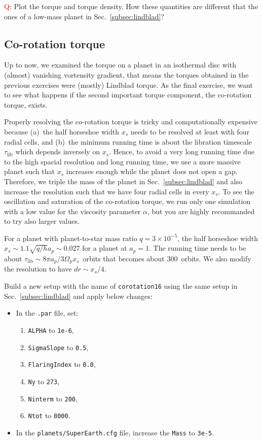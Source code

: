 \documentclass[14pt]{scrartcl}
\begin{document}
\textcolor{red}{Q}: Plot the torque and torque density. How these quantities are different that the ones of a low-mass planet in Sec.~\ref{subsec:lindblad}?

\subsection{Co-rotation torque} \label{subsec:corotation}	
Up to now, we examined the torque on a planet in an isothermal disc with (almost) vanishing vortensity gradient, that means the torques obtained in the previous exercises were (mostly) Lindblad torque. As the final exercise, we want to see what happens if the second important torque component, the co-rotation torque, exists. 

Properly resolving the co-rotation torque is tricky and computationally expensive because (a)~the half horseshoe width $x_s$ needs to be resolved at least with four radial cells, and (b)~the minimum running time is about the libration timescale $\tau_{\mathrm{lib}}$ which depends inversely on $x_s$. Hence, to avoid a very long running time due to the high spacial resolution and long running time, we use a more massive planet such that $x_s$ increases enough while the planet does not open a gap. Therefore, we triple the mass of the planet in Sec.~\ref{subsec:lindblad} and also increase the resolution such that we have four radial cells in every $x_s$. To see the oscillation and saturation of the co-rotation torque, we run only one simulation with a low value for the viscosity parameter $\alpha$, but you are highly recommanded to try also larger values.

For a planet with planet-to-star mass ratio $q=3 \times 10^{-5}$, the half horseshoe width $x_s \sim 1.1 \sqrt{q/h} a_p \sim 0.027$ for a planet at $a_p=1$. The running time needs to be about $\tau_{\mathrm{lib}} \sim 8 \pi a_p/3 \Omega_p x_s  $~orbits that becomes about 300~orbits. We also modify the resolution to have $dr \sim x_s/4$.

Build a new setup with the name of \texttt{corotation16} using the same setup in Sec.~\ref{subsec:lindblad} and apply below changes:  
\begin{itemize}
	\item In the \texttt{.par} file, set:
	\begin{enumerate}
		\item \texttt{ALPHA} to \texttt{1e-6},
		\item \texttt{SigmaSlope} to \texttt{0.5},
		\item \texttt{FlaringIndex} to \texttt{0.0},
		\item \texttt{Ny} to \texttt{273},
		\item \texttt{Ninterm} to \texttt{200},
		\item \texttt{Ntot} to \texttt{8000}. 	
	\end{enumerate}
	\item In the \texttt{planets/SuperEarth.cfg} file, increase the \texttt{Mass} to \texttt{3e-5}.
\end{itemize}
\end{document}
